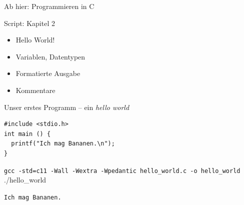 
\begin{frame}{Ab hier: Programmieren in C}
%
\begin{Large}
Script: Kapitel 2
\end{Large}
%
\begin{itemize}
\item Hello World!
\item Variablen, Datentypen
\item Formatierte Ausgabe
\item Kommentare
\end{itemize}
%
\end{frame}


\begin{frame}[fragile]{Unser erstes Programm --  ein \emph{hello world}}
%
\begin{codebox}
\begin{verbatim}
#include <stdio.h>
int main () {
  printf("Ich mag Bananen.\n");
}
\end{verbatim}
\end{codebox}
%
\begin{cmdbox}
  \footnotesize\texttt{gcc -std=c11 -Wall -Wextra -Wpedantic hello\_world.c -o hello\_world} \\
  ./hello\_world
\end{cmdbox}
%	
\begin{cmdbox}[Ausgabe]
  \footnotesize\texttt{Ich mag Bananen.}
\end{cmdbox}

\end{frame}


